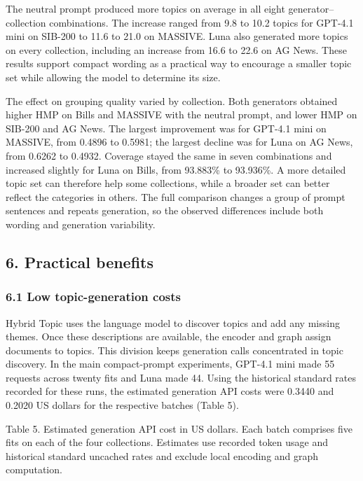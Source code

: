 \documentclass[
  11pt,
  a4paper,
]{article}
\begin{document}
The neutral prompt produced more topics on average in all eight
generator--collection combinations. The increase ranged from 9.8 to 10.2
topics for GPT-4.1 mini on SIB-200 to 11.6 to 21.0 on MASSIVE. Luna also
generated more topics on every collection, including an increase from
16.6 to 22.6 on AG News. These results support compact wording as a
practical way to encourage a smaller topic set while allowing the model
to determine its size.

The effect on grouping quality varied by collection. Both generators
obtained higher HMP on Bills and MASSIVE with the neutral prompt, and
lower HMP on SIB-200 and AG News. The largest improvement was for
GPT-4.1 mini on MASSIVE, from 0.4896 to 0.5981; the largest decline was
for Luna on AG News, from 0.6262 to 0.4932. Coverage stayed the same in
seven combinations and increased slightly for Luna on Bills, from
93.883\% to 93.936\%. A more detailed topic set can therefore help some
collections, while a broader set can better reflect the categories in
others. The full comparison changes a group of prompt sentences and
repeats generation, so the observed differences include both wording and
generation variability.

\subsection{6. Practical benefits}\label{practical-benefits}

\subsubsection{6.1 Low topic-generation
costs}\label{low-topic-generation-costs}

Hybrid Topic uses the language model to discover topics and add any
missing themes. Once these descriptions are available, the encoder and
graph assign documents to topics. This division keeps generation calls
concentrated in topic discovery. In the main compact-prompt experiments,
GPT-4.1 mini made 55 requests across twenty fits and Luna made 44. Using
the historical standard rates recorded for these runs, the estimated
generation API costs were 0.3440 and 0.2020 US dollars for the
respective batches (Table 5).


Table 5. Estimated generation API cost in US dollars. Each batch
comprises five fits on each of the four collections. Estimates use
recorded token usage and historical standard uncached rates and exclude
local encoding and graph computation.
\end{document}
